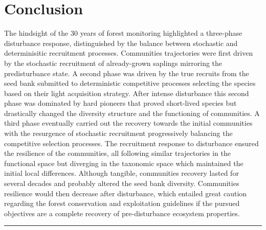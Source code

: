\documentclass[fleqn,10pt]{ArtEcoFoG} %
\begin{document}
\section{Conclusion}\label{conclusion}

The hindsight of the 30 years of forest monitoring highlighted a
three-phase disturbance response, distinguished by the balance between
stochastic and determinisitic recruitment processes. Communities
trajectories were first driven by the stochastic recruitment of
already-grown saplings mirroring the predisturbance state. A second
phase was driven by the true recruits from the seed bank submitted to
deterministic competitive processes selecting the species based on their
light acquisition strategy. After intense disturbance this second phase
was dominated by hard pioneers that proved short-lived species but
drastically changed the diversity structure and the functioning of
communities. A third phase eventually carried out the recovery towards
the initial communities with the resurgence of stochastic recruitment
progressively balancing the competitive selection processes. The
recruitment response to disturbance ensured the resilience of the
communities, all following similar trajectories in the functional space
but diverging in the taxonomic space which maintained the initial local
differences. Although tangible, communities recovery lasted for several
decades and probably altered the seed bank diversity. Communities
resilience would then decrease after disturbance, which entailed great
caution regarding the forest conservation and exploitation guidelines if
the pursued objectives are a complete recovery of pre-disturbance
ecosystem properties.

\begin{center}\rule{0.5\linewidth}{\linethickness}\end{center}



\makeatletter

\makeatother


\end{document}
